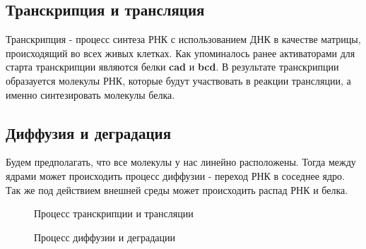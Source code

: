 \subsection{Транскрипция и трансляция}
Транскрипция - процесс синтеза РНК с использованием ДНК в качестве матрицы, происходящий во всех живых клетках. Как упоминалось ранее активаторами
для старта транскрипции являются белки \textbf{cad} и \textbf{bcd}. В результате транскрипции образауется молекулы РНК, которые будут участвовать в
реакции трансляции, а именно синтезировать молекулы белка.

\subsection{Диффузия и деградация}
Будем предполагать, что все молекулы у нас линейно расположены. Тогда между ядрами может происходить процесс диффузии - переход РНК в соседнее ядро.
Так же под действием внешней среды может происходить распад РНК и белка.

\begin{figure}[!h]
  \caption{Процесс транскрипции и трансляции}
  \label{fig:geene_exp2}
\end{figure}

\begin{figure}[!h]
  \caption{Процесс диффузии и деградации}
  \label{fig:geene_exp3}
\end{figure}
